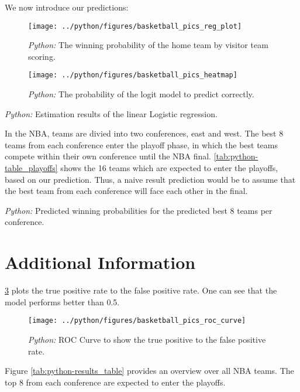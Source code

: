 \documentclass[11pt, a4paper, leqno]{article}
\begin{document}
We now introduce our predictions:


\begin{figure}[!h]
\centering
\caption{\emph{Python:} The winning probability of the home team by visitor team scoring.}
\texttt{[image: ../python/figures/basketball\_pics\_reg\_plot]}
    \label{fig:python-reg_plot}

\end{figure}

\begin{figure}[!h]

    \centering
    \caption{\emph{Python:} The probability of the logit model to predict correctly.}
    \texttt{[image: ../python/figures/basketball\_pics\_heatmap]}
    \label{fig:python-heatmap}

\end{figure}

\begin{table}[!h]
    \caption{\label{tab:python-inference_model}\emph{Python:} Estimation results of the
    linear Logistic regression.}
    
\end{table}

In the NBA, teams are divied into two conferences, east and west. The best 8 teams from each conference enter the playoff phase, in which the best teams compete within their own conference until the NBA final.
\ref{tab:python-table_playoffs} shows the 16 teams which are expected to enter the playoffs, based on our prediction. Thus, a naive result prediction would be to assume that the best team from each conference will face each other in the final.

\begin{table}[!h]
    \caption{\label{tab:python-table_playoffs}\emph{Python:} Predicted winning probabilities for the predicted best 8 teams per conference.}
    
\end{table}




\section{Additional Information}

\ref{fig:python-roc_curve} plots the true positive rate to the false positive rate. One can see that the model performs better than 0.5.

\begin{figure}[!h]
   \centering
    \caption{\emph{Python:} ROC Curve to show the true positive to the false positive rate.}
    \texttt{[image: ../python/figures/basketball\_pics\_roc\_curve]}
    \label{fig:python-roc_curve}

\end{figure}
Figure \ref{tab:python-results_table} provides an overview over all NBA teams. The top 8 from each conference are expected to enter the playoffs.

\begin{tabular}[!h]
    \caption{\label{tab:python-results_table}\emph{Python:} Predicted winning probabilities for all NBA teams.}
    
\end{tabular}



\printbibliography
{}
\end{document}
